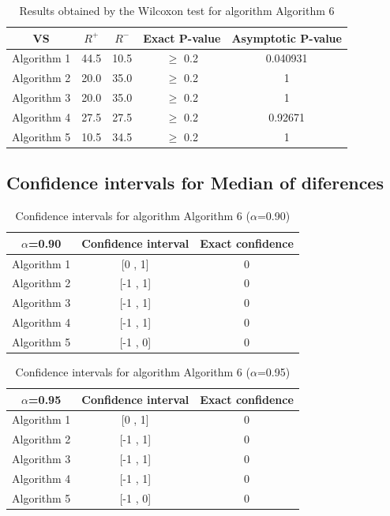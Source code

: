 \documentclass[a4paper,10pt]{article}
\begin{document}
\begin{table}[!htp]
\centering\small
\begin{tabular}{
|c|c|c|c|c|}
\hline
 VS & $R^{+}$ & $R^{-}$ & Exact P-value & Asymptotic P-value \\ \hline 
Algorithm 1 & 44.5 & 10.5 & $\geq$ 0.2 & 0.040931\\ \hline 
Algorithm 2 & 20.0 & 35.0 & $\geq$ 0.2 & 1\\ \hline 
Algorithm 3 & 20.0 & 35.0 & $\geq$ 0.2 & 1\\ \hline 
Algorithm 4 & 27.5 & 27.5 & $\geq$ 0.2 & 0.92671\\ \hline 
Algorithm 5 & 10.5 & 34.5 & $\geq$ 0.2 & 1\\ \hline 

\end{tabular}
\caption{Results obtained by the Wilcoxon test for algorithm Algorithm 6}
\end{table}

\subsection{Confidence intervals for Median of diferences}

\begin{table}[!htp]
\centering\small
\begin{tabular}{
|c|c|c|}
\hline
 $\alpha$=0.90 & Confidence interval & Exact confidence \\ \hline 
Algorithm 1 & [0 , 1] & 0\\ \hline 
Algorithm 2 & [-1 , 1] & 0\\ \hline 
Algorithm 3 & [-1 , 1] & 0\\ \hline 
Algorithm 4 & [-1 , 1] & 0\\ \hline 
Algorithm 5 & [-1 , 0] & 0\\ \hline 

\end{tabular}
\caption{Confidence intervals for algorithm Algorithm 6 ($\alpha$=0.90)}
\end{table}
\begin{table}[!htp]
\centering\small
\begin{tabular}{
|c|c|c|}
\hline
 $\alpha$=0.95 & Confidence interval & Exact confidence \\ \hline 
Algorithm 1 & [0 , 1] & 0\\ \hline 
Algorithm 2 & [-1 , 1] & 0\\ \hline 
Algorithm 3 & [-1 , 1] & 0\\ \hline 
Algorithm 4 & [-1 , 1] & 0\\ \hline 
Algorithm 5 & [-1 , 0] & 0\\ \hline 

\end{tabular}
\caption{Confidence intervals for algorithm Algorithm 6 ($\alpha$=0.95)}
\end{table}

 \clearpage 
\end{document}
